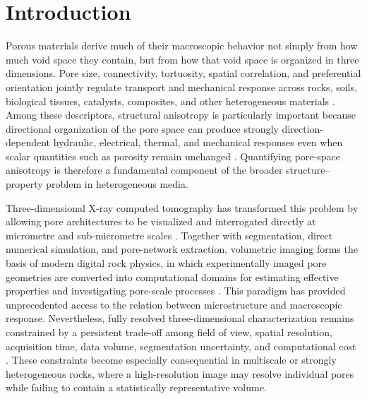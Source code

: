 \documentclass{article}
\begin{document}

\section{Introduction}
\label{sec:introduction}

Porous materials derive much of their macroscopic behavior not simply from how much void space they contain, but from how that void space is organized in three dimensions. Pore size, connectivity, tortuosity, spatial correlation, and preferential orientation jointly regulate transport and mechanical response across rocks, soils, biological tissues, catalysts, composites, and other heterogeneous materials \cite{Bear1972,Dullien1992,Torquato2002,Sahimi2011}. Among these descriptors, structural anisotropy is particularly important because directional organization of the pore space can produce strongly direction-dependent hydraulic, electrical, thermal, and mechanical responses even when scalar quantities such as porosity remain unchanged \cite{Cowin2004,Inglis2003,Gerke2019}. Quantifying pore-space anisotropy is therefore a fundamental component of the broader structure--property problem in heterogeneous media.

Three-dimensional X-ray computed tomography has transformed this problem by allowing pore architectures to be visualized and interrogated directly at micrometre and sub-micrometre scales \cite{Wildenschild2013,Cnudde2013,Blunt2013}. Together with segmentation, direct numerical simulation, and pore-network extraction, volumetric imaging forms the basis of modern digital rock physics, in which experimentally imaged pore geometries are converted into computational domains for estimating effective properties and investigating pore-scale processes \cite{DongBlunt2009,Blunt2013,Mehmani2020,Sadeghnejad2021}. This paradigm has provided unprecedented access to the relation between microstructure and macroscopic response. Nevertheless, fully resolved three-dimensional characterization remains constrained by a persistent trade-off among field of view, spatial resolution, acquisition time, data volume, segmentation uncertainty, and computational cost \cite{Wildenschild2013,Cnudde2013,Mehmani2020}. These constraints become especially consequential in multiscale or strongly heterogeneous rocks, where a high-resolution image may resolve individual pores while failing to contain a statistically representative volume.
\end{document}
